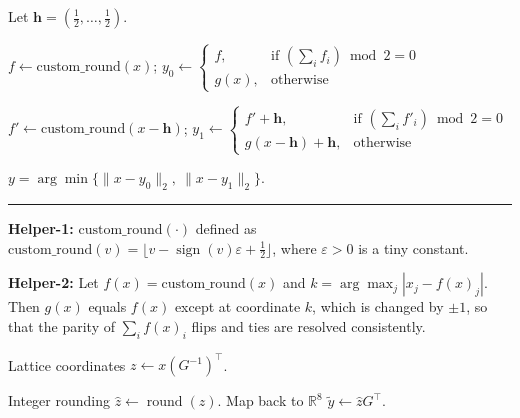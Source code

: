 \documentclass{article}
\theoremstyle{definition}
\theoremstyle{remark}
\begin{document}
\begin{algorithm}[]
\caption{Nearest-neighbor projection $ Q_{\mathrm{E8}}\bigl(
    \cdot
  \bigr)$}
  \scriptsize
\setcounter{AlgoLine}{0}
\label{qe8}
\DontPrintSemicolon
{}

\nl Let $\mathbf{h}=(\tfrac12,\dots,\tfrac12)$.\;

\nl $f \leftarrow \mathrm{custom\_round}(x)$;\;
$y_0 \leftarrow \begin{cases}
f, & \text{if } (\sum_i f_i)\bmod 2 = 0\\
g(x), & \text{otherwise}
\end{cases}$\;

\nl $f' \leftarrow \mathrm{custom\_round}(x-\mathbf{h})$;\;
$y_1 \leftarrow \begin{cases}
f'+\mathbf{h}, & \text{if } (\sum_i f'_i)\bmod 2 = 0\\
g(x-\mathbf{h})+\mathbf{h}, & \text{otherwise}
\end{cases}$\;

\nl \Return $y = \arg\min\{\|x-y_0\|_2,\ \|x-y_1\|_2\}$.\;

\vspace{2pt}
\hrule
\vspace{2pt}

\nl \textbf{Helper-1:} $\mathrm{custom\_round}(\cdot)$ defined as
$\mathrm{custom\_round}(v)=\lfloor v-\operatorname{sign}(v)\varepsilon+\tfrac12\rfloor$,
where $\varepsilon>0$ is a tiny constant.

\nl \textbf{Helper-2:} Let $f(x)=\mathrm{custom\_round}(x)$ and
$k=\arg\max_j |x_j-f(x)_j|$.
Then $g(x)$ equals $f(x)$ except at coordinate $k$, which is changed by $\pm1$,
so that the parity of $\sum_i f(x)_i$ flips and ties are resolved consistently.\;
\end{algorithm}
\begin{algorithm}
\caption{Babai projection onto $E_8$}
\setcounter{AlgoLine}{0}
\scriptsize
\label{alg:e8-babai}
\DontPrintSemicolon
{}

\nl Lattice coordinates $z \gets x (G^{-1})^\top$.

\nl Integer rounding $\hat{z} \gets \operatorname{round}(z)$. 
\nl Map back to $\mathbb{R}^8$ $\tilde{y} \gets \hat{z} G^\top$.
\end{algorithm}
\end{document}
